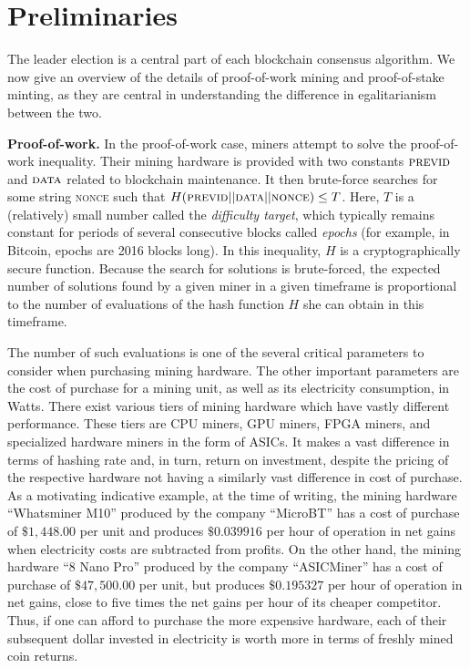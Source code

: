 \section{Preliminaries}\label{sec:preliminaries}

The leader election is a central part of each blockchain consensus algorithm. We
now give an overview of the details of proof-of-work mining and proof-of-stake
minting, as they are central in understanding the difference in egalitarianism
between the two.

\noindent\textbf{Proof-of-work.}
In
the proof-of-work case, miners attempt to solve the proof-of-work inequality. Their
mining hardware is provided with two constants $\textsc{previd}$ and $\textsc{data}$
related to blockchain maintenance. It then
brute-force searches for some string \textsc{nonce} such that
$H(\textsc{previd} || \textsc{data} || \textsc{nonce}) \leq T$. Here, $T$ is a
(relatively) small number called
the \emph{difficulty target}, which typically remains constant for periods of several
consecutive blocks called \emph{epochs} (for example, in Bitcoin, epochs are
2016 blocks long). In this inequality, $H$ is a
cryptographically secure function. Because the search for solutions is
brute-forced, the expected number of solutions found by a given miner in a given
timeframe is proportional to the number of evaluations of the hash function $H$
she can obtain in this timeframe.


The number of such evaluations is one of the several critical parameters to consider when purchasing
mining hardware. The other important parameters are the cost of purchase for a mining unit,
as well as its electricity consumption, in Watts.
There exist various tiers of mining hardware which have
vastly different performance. These tiers are CPU miners, GPU miners, FPGA miners,
and specialized hardware miners in the form of ASICs. It makes a vast difference in
terms of hashing rate and, in turn, return on investment, despite the pricing of
the respective hardware not having a similarly vast difference in cost of
purchase. As a motivating indicative example, at the time of writing, the mining hardware ``Whatsminer
M10'' produced by the company ``MicroBT'' has a cost of purchase of $\$1,448.00$ per unit and produces $\$0.039916$ per hour
of operation in net gains when electricity costs are subtracted from profits. On
the other hand, the mining hardware ``8 Nano Pro'' produced by the company ``ASICMiner'' has a cost of purchase of
$\$47,500.00$ per unit, but produces $\$0.195327$ per hour of operation in net gains, close to five times the net gains per hour of its cheaper competitor.
Thus, if one can afford to purchase the more expensive hardware, each of their
subsequent dollar invested in electricity is worth more in terms of freshly mined coin returns.

